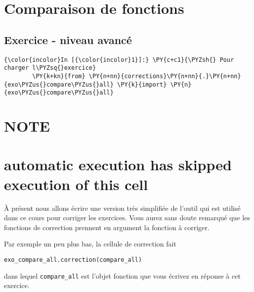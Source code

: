     
    
    
    

    

    \hypertarget{comparaison-de-fonctions}{%
\section{Comparaison de fonctions}\label{comparaison-de-fonctions}}

    \hypertarget{exercice---niveau-avancuxe9}{%
\subsection{Exercice - niveau
avancé}\label{exercice---niveau-avancuxe9}}

    \begin{Verbatim}[commandchars=\\\{\}]
{\color{incolor}In [{\color{incolor}1}]:} \PY{c+c1}{\PYZsh{} Pour charger l\PYZsq{}exercice}
        \PY{k+kn}{from} \PY{n+nn}{corrections}\PY{n+nn}{.}\PY{n+nn}{exo\PYZus{}compare\PYZus{}all} \PY{k}{import} \PY{n}{exo\PYZus{}compare\PYZus{}all}
\end{Verbatim}


    \hypertarget{note}{%
\section{NOTE}\label{note}}

\hypertarget{automatic-execution-has-skipped-execution-of-this-cell}{%
\section{automatic execution has skipped execution of this
cell}\label{automatic-execution-has-skipped-execution-of-this-cell}}

À présent nous allons écrire une version très simplifiée de l'outil qui
est utilisé dans ce cours pour corriger les exercices. Vous aurez sans
doute remarqué que les fonctions de correction prennent en argument la
fonction à corriger.

Par exemple un peu plus bas, la cellule de correction fait

\begin{verbatim}
exo_compare_all.correction(compare_all)  
\end{verbatim}

dans lequel \texttt{compare\_all} est l'objet fonction que vous écrivez
en réponse à cet exercice.

